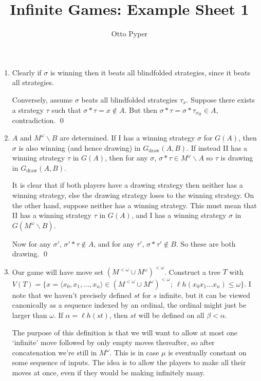 \documentclass[]{article}
\title{Infinite Games: Example Sheet 1}
\author{Otto Pyper}
\date{}
\newcommand{\II}{\textrm{II}}
\newcommand{\om}{\omega}
\newcommand{\lom}{{<\omega}}
\newcommand{\lh}{\ell h}
\begin{document}
\maketitle
\begin{enumerate}[label = (\arabic*)]
    \item Clearly if $\sigma$ is winning then it beats all blindfolded strategies, since it beats all strategies.

    Conversely, assume $\sigma$ beats all blindfolded strategies $\tau_x$. Suppose there exists a strategy $\tau$ such that $\sigma\ast \tau = x \not \in A$. But then $\sigma \ast \tau = \sigma \ast \tau_{x_\II} \in A$, contradiction. \qed

    \item $A$ and $M^\om\backslash B$ are determined. If I has a winning strategy $\sigma$ for $G(A)$, then $\sigma$ is also winning (and hence drawing) in $G_{\textrm{draw}}(A,B)$. If instead II has a winning strategy $\tau$ in $G(A)$, then for any $\sigma$, $\sigma\ast\tau \in M^\om \backslash A$ so $\tau$ is drawing in $G_{\textrm{draw}}(A,B)$.
    
    It is clear that if both players have a drawing strategy then neither has a winning strategy, else the drawing strategy loses to the winning strategy. On the other hand, suppose neither has a winning strategy. This must mean that II has a winning strategy $\tau$ in $G(A)$, and I has a winning strategy $\sigma$ in $G(M^\om \backslash B)$.
    
    Now for any $\sigma'$, $\sigma' \ast \tau \not\in A$, and for any $\tau'$, $\sigma\ast\tau' \not\in B$. So these are both drawing. \qed

    \item Our game will have move set $(M^\lom\cup M^\om)^\lom$. Construct a tree $T$ with $V(T) = \{x = \langle x_0,x_1,\dots,x_n\rangle \in (M^\lom\cup M^\om)^\lom;\ \lh(x_0x_1\dots x_n) \le \om \}$. I note that we haven't precisely defined $st$ for $s$ infinite, but it can be viewed canonically as a sequence indexed by an ordinal, the ordinal might just be larger than $\om$. If $\alpha = \lh(st)$, then $st$ will be defined on all $\beta < \alpha$.
    
    The purpose of this definition is that we will want to allow at most one `infinite' move followed by only empty moves thereafter, so after concatenation we're still in $M^\om$. This is in case $\mu$ is eventually constant on some sequence of inputs. The idea is to allow the players to make all their moves at once, even if they would be making infinitely many.
    

\end{enumerate}
\end{document}
